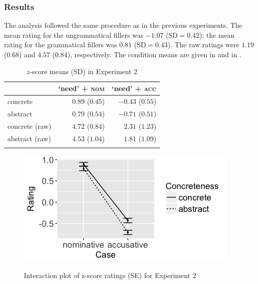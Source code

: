 \documentclass[output=paper,colorlinks,citecolor=brown]{langscibook}
\begin{document}
\subsubsection{Results}

The analysis followed the same procedure as in the previous experiments. The mean rating for the ungrammatical fillers was $-1.07$ ($\text{SD} =0.42$); the mean rating for the grammatical fillers was $0.81$ ($\text{SD} =0.43$). The raw ratings were $1.19$ ($0.68$) and $4.57$ ($0.84$), respectively. The condition means are given in  and in . %


\begin{table}
\centering
\begin{tabularx}{0.61\textwidth}{Xrr}
\lsptoprule
   & `need' + \textsc{nom} & `need' + \textsc{acc}\\
\midrule
concrete  &   $0.89$ ($0.45$) &   $-0.43$ ($0.55$)\\
abstract  &   $0.79$ ($0.54$) &   $-0.71$ ($0.51$)\\
concrete (raw)  &   $4.72$ ($0.84$) &   $2.31$ ($1.23$)\\
abstract (raw) &   $4.53$ ($1.04$) &   $1.81$ ($1.09$)\\
\lspbottomrule
\end{tabularx}
\caption{$z$-score means (SD) in Experiment 2}
\label{tab:1:means-exp2}
\end{table}

\begin{figure}
\caption{Interaction plot of z-score ratings (SE) for Experiment 2}
\centering
\includegraphics[scale = 0.5]{figures/exp2_13.png}
\label{fig:exp2}
\end{figure}
\end{document}
